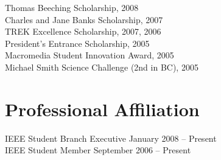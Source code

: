 \documentclass[margin,line]{resume}
\begin{document}
\begin{resume}
    Thomas Beeching Scholarship, 2008
        \vspace{1mm}\\%
    Charles and Jane Banks Scholarship, 2007
        \vspace{1mm}\\%
    TREK Excellence Scholarship, 2007, 2006
        \vspace{1mm}\\%
    President's Entrance Scholarship, 2005
        \vspace{1mm}\\%
    Macromedia Student Innovation Award, 2005
        \vspace{1mm}\\%
    Michael Smith Science Challenge (2nd in BC), 2005

    \section{\mysidestyle Professional Affiliation}
    IEEE Student Branch Executive \hfill January 2008 -- Present\vspace{1mm}\\
    IEEE Student Member \hfill September 2006 -- Present


\end{resume}
\end{document}
